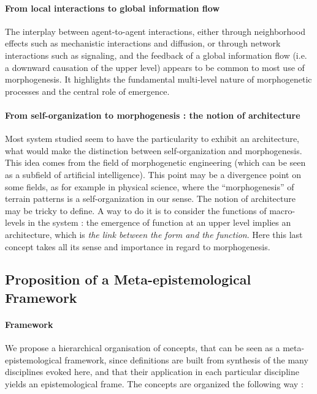 \documentclass[fleqn,10pt]{wlscirep}
\begin{document}
\paragraph{From local interactions to global information flow}


The interplay between agent-to-agent interactions, either through neighborhood effects such as mechanistic interactions and diffusion, or through network interactions such as signaling, and the feedback of a global information flow (i.e. a downward causation of the upper level) appears to be common to most use of morphogenesis. It highlights the fundamental multi-level nature of morphogenetic processes and the central role of emergence.

\paragraph{From self-organization to morphogenesis : the notion of architecture}

Most system studied seem to have the particularity to exhibit an architecture, what would make the distinction between self-organization and morphogenesis. This idea comes from the field of morphogenetic engineering (which can be seen as a subfield of artificial intelligence). This point may be a divergence point on some fields, as for example in physical science, where the ``morphogenesis'' of terrain patterns is a self-organization in our sense. The notion of architecture may be tricky to define. A way to do it is to consider the functions of macro-levels in the system : the emergence of function at an upper level implies an architecture, which is \emph{the link between the form and the function}. Here this last concept takes all its sense and importance in regard to morphogenesis.


\subsection*{Proposition of a Meta-epistemological Framework}


\paragraph{Framework}

We propose a hierarchical organisation of concepts, that can be seen as a meta-epistemological framework, since definitions are built from synthesis of the many disciplines evoked here, and that their application in each particular discipline yields an epistemological frame. The concepts are organized the following way :
\end{document}
